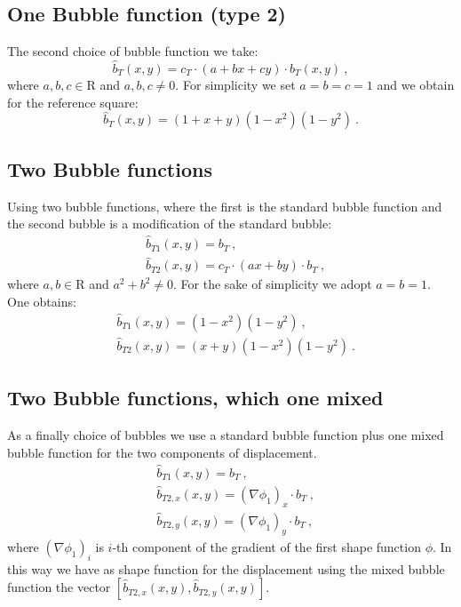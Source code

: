 \documentclass[preprint,12pt,authoryear]{elsarticle}
\begin{document}
\subsection{One Bubble function (type 2)}
The second choice of bubble function we take:
\begin{equation}\label{eq:bubble_2}
\hat{b}_{T}(x,y) = c_{T}\cdot (a+bx+cy)\cdot b_{T}(x,y)\:,
\end{equation}
where $a,b,c \in \mathrm{R}$ and $a,b,c \neq 0$.
For simplicity we set $a=b=c=1$ and we obtain for the reference square:
\begin{equation}\label{eq:bubble_2_ref}
\hat{b}_{T}(x,y) = (1+x+y)(1-x^{2})(1-y^{2})\:.
\end{equation} 

\subsection{Two Bubble functions}
Using two bubble functions, where the first is the standard bubble function and the second bubble is a modification of the standard bubble:
\begin{equation}\label{eq:bubble_3}
\begin{split}
&\hat{b}_{T1}(x,y) = b_{T}\:, \\
&\hat{b}_{T2}(x,y) = c_{T}\cdot (ax+by)\cdot b_{T}\:,
\end{split}
\end{equation}
where $a,b \in \mathrm{R}$ and $a^{2}+b^{2}\neq 0$.
For the sake of simplicity we adopt $a=b=1$.
One obtains:
\begin{equation}\label{eq:bubble_3_ref}
\begin{split}
&\hat{b}_{T1}(x,y) = (1-x^{2})(1-y^{2})\:, \\
&\hat{b}_{T2}(x,y) = (x+y)(1-x^{2})(1-y^{2})\:.
\end{split}
\end{equation}

\subsection{Two Bubble functions, which one mixed}
As a finally choice of bubbles we use a standard bubble function plus one mixed bubble function for the two components of displacement.
\begin{equation}
\begin{split}
&\hat{b}_{T1}(x,y) = b_{T}\:, \\
&\hat{b}_{T2,x}(x,y) = (\nabla \phi_{1})_{x}\cdot b_{T}\:, \\
&\hat{b}_{T2,y}(x,y) = (\nabla \phi_{1})_{y}\cdot b_{T}\:,
\end{split}
\end{equation}
where $(\nabla\phi_{1})_{i}$ is $i$-th component of the gradient of the first shape function $\phi$.
In this way we have as shape function for the displacement using the mixed bubble function the vector $\left[\hat{b}_{T2,x}(x,y),\hat{b}_{T2,y}(x,y)\right]$. 
\end{document}
